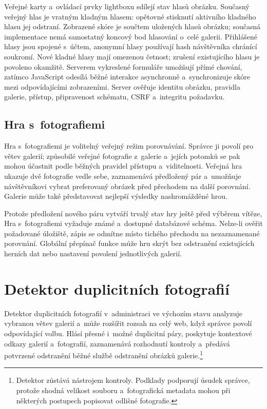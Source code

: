 \documentclass[11pt,a4paper]{article}
\begin{document}
Veřejné karty a~ovládací prvky lightboxu sdílejí stav hlasů obrázku. Současný
veřejný hlas je vratným kladným hlasem: opětovné stisknutí aktivního kladného
hlasu jej odstraní. Zobrazené skóre je součtem uložených hlasů obrázku; současná
implementace nemá samostatný koncový bod hlasování o~celé galerii. Přihlášené
hlasy jsou spojené s~účtem, anonymní hlasy používají hash návštěvníka chránící
soukromí. Nové kladné hlasy mají omezenou četnost; zrušení existujícího hlasu je
povoleno okamžitě. Serverem vykreslené formuláře umožňují přímé chování, zatímco
JavaScript odesílá běžné interakce asynchronně a~synchronizuje skóre mezi
odpovídajícími zobrazeními. Server ověřuje identitu obrázku, pravidla galerie,
přístup, připravenost schématu, CSRF a~integritu požadavku.

\subsection{Hra s~fotografiemi}

Hra s~fotografiemi je volitelný veřejný režim porovnávání. Správce ji povolí pro
větev galerií; způsobilé veřejné fotografie z~galerie a~jejích potomků se pak
mohou účastnit podle běžných pravidel přístupu a~viditelnosti. Veřejná hra
ukazuje dvě fotografie vedle sebe, zaznamenává předložený pár a~umožňuje
návštěvníkovi vybrat preferovaný obrázek před přechodem na další porovnání.
Galerie může také představovat nejlepší výsledky nashromážděné hrou.

Protože předložení nového páru vytváří trvalý stav hry ještě před výběrem
vítěze, Hra s~fotografiemi vyžaduje známé a~dostupné databázové schéma. Nelze-li
ověřit požadované úložiště, zápis se odmítne místo tichého přechodu na
nezaznamenané porovnání. Globální přepínač funkce může hru skrýt bez odstranění
existujících herních dat nebo nastavení povolení jednotlivých galerií.

\section{Detektor duplicitních fotografií}
\label{sec:duplicates}

Detektor duplicitních fotografií v~administraci ve výchozím stavu analyzuje
vybranou větev galerií a~může rozšířit rozsah na celý web, když správce povolí
odpovídající volbu. Hlásí přesné i~možné duplicitní páry, poskytuje kontextové
odkazy galerií a~fotografií, zaznamenává rozhodnutí kontroly a~předává potvrzené
odstranění běžné službě odstranění obrázků galerie.\footnote{Detektor zůstává
nástrojem kontroly. Podklady podporují úsudek správce, protože shodná velikost
souboru a~fotografická metadata mohou při některých postupech popisovat odlišné
fotografie.}
\end{document}
